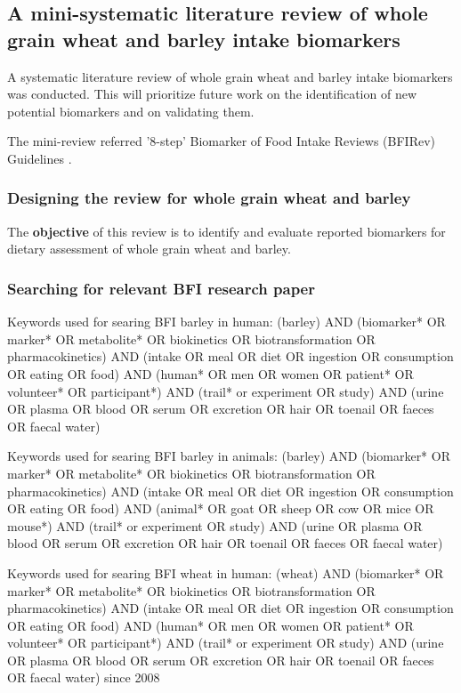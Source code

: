 \subsection{A mini-systematic literature review of whole grain wheat and barley intake biomarkers}
A systematic literature review of whole grain wheat and barley intake biomarkers was conducted. This will prioritize future work on the identification of new potential biomarkers and on validating them.

The mini-review referred '8-step' Biomarker of Food Intake Reviews (BFIRev) Guidelines \cite{Pratico2018}.

\subsubsection{Designing the review for whole grain wheat and barley}
The \textbf{objective} of this review is to identify and evaluate reported biomarkers for dietary assessment of whole grain wheat and barley.

\subsubsection{Searching for relevant BFI research paper}
Keywords used for searing BFI barley in human: 
(barley) AND (biomarker* OR marker* OR metabolite* OR biokinetics OR biotransformation OR pharmacokinetics) AND (intake OR meal OR diet OR ingestion OR consumption OR eating OR food) AND 
(human* OR men OR women OR patient* OR volunteer* OR participant*) AND 
(trail* or experiment OR study) AND (urine OR plasma OR blood OR serum OR excretion OR hair OR toenail OR faeces OR faecal water)

Keywords used for searing BFI barley in animals: 
(barley) AND (biomarker* OR marker* OR metabolite* OR biokinetics OR biotransformation OR pharmacokinetics) AND (intake OR meal OR diet OR ingestion OR consumption OR eating OR food) AND 
(animal* OR goat OR sheep OR cow OR mice OR mouse*) AND 
(trail* or experiment OR study) AND (urine OR plasma OR blood OR serum OR excretion OR hair OR toenail OR faeces OR faecal water)

Keywords used for searing BFI wheat in human: 
(wheat) AND (biomarker* OR marker* OR metabolite* OR biokinetics OR biotransformation OR pharmacokinetics) AND (intake OR meal OR diet OR ingestion OR consumption OR eating OR food) AND 
(human* OR men OR women OR patient* OR volunteer* OR participant*) AND 
(trail* or experiment OR study) AND (urine OR plasma OR blood OR serum OR excretion OR hair OR toenail OR faeces OR faecal water) since 2008

